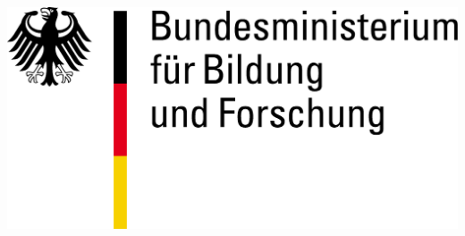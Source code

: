 \begin{frame}{}
\begin{changemargin}{-1cm}{-1cm}
{\begin{minipage}{\tmp}
		\end{minipage}
	}
	{
		\begin{minipage}{\tmp}
			\includegraphics[width=\tmpp]{figures/logos/bmbf.pdf}
		\end{minipage}
	}
	\end{changemargin}
\end{frame}